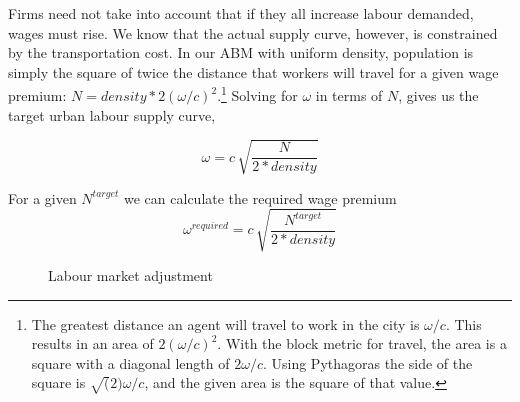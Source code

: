 Firms need not take into account that if they all increase labour demanded, wages must rise. We know that the actual supply curve, however, is constrained by the transportation cost. In our ABM with uniform density, population is simply the square of twice the distance that workers will travel for a given wage premium: $N=density*2(\omega/c)^2$.\footnote{The greatest distance  an agent will travel to work in the city is $\omega/c$. This results in an area of $2(\omega/c)^2$. With the block metric for travel, the area is a square with a diagonal length of $2\omega/c$. Using Pythagoras the side of the square is $\sqrt(2)\omega/c$, and the given area is the square of that value.} %
Solving for $\omega$ in terms of $N$, %
gives us the target urban labour supply curve, 

\begin{equation}
   \omega= c\, \sqrt{\frac{N}{2 * density}}
\label{eqn:Labour-supply}\end{equation}

For a given $N^{target}$ we can calculate the required wage premium
\begin{equation}
   \omega^{required}= c\, \sqrt{\frac{N^{target}}{2 * density}}
\label{eqn:Labour-supply}\end{equation}


\begin{figure}
    \centering
    \caption {Labour market adjustment}
    \label{fig:cobweb}
\end{figure}



